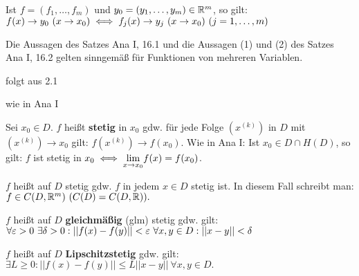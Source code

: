 \documentclass[a4paper,twoside,DIV15,BCOR12mm]{scrbook}
\begin{document}
\begin{satz}
\begin{liste}
\item Ist $f = (f_1,\ldots,f_m)$ und $y_0 = (y_1,\ldots,y_m) \in \mathbb{R}^m$, so gilt: $f(x) \to y_0\ (x \to x_0) \iff f_j(x) \to y_j\ (x \to x_0)\ (j=1,\ldots,m)$
\item Die Aussagen des Satzes Ana I, 16.1 und die Aussagen (1) und (2) des Satzes Ana I, 16.2 gelten sinngemäß für Funktionen von mehreren Variablen.
\end{liste}
\end{satz}

\begin{beweise}
\item folgt aus 2.1
\item wie in Ana I
\end{beweise}

\begin{definition*}
\begin{liste}
\item {}Sei $x_0 \in D$. $f$ heißt \textbf{stetig} in $x_0$ gdw. für jede Folge $(x^{(k)})$ in $D$ mit $(x^{(k)}) \to x_0$ gilt: $f(x^{(k)}) \to f(x_0)$. Wie in Ana I: Ist $x_0 \in D \cap H(D)$, so gilt: $f$ ist stetig in $x_0 \iff \displaystyle{\lim_{x \to x_0}} f(x) = f(x_0)$.
\item {}$f$ heißt auf $D$ stetig gdw. $f$ in jedem $x \in D$ stetig ist. In diesem Fall schreibt man: $f \in C(D,\mathbb{R}^m)\ (C(D) = C(D,\mathbb{R})).$
\item {}$f$ heißt auf $D$ \textbf{gleichmäßig} (glm) stetig gdw. gilt:\\
$\forall \varepsilon>0\ \exists \delta>0: ||f(x)-f(y)|| < \varepsilon\ \forall x,y \in D: ||x-y|| < \delta$
\item {}$f$ heißt auf $D$  \textbf{Lipschitzstetig} gdw. gilt:\\
$\exists L\ge0: ||f(x)-f(y)|| \le L||x-y||\ \forall x,y \in D.$
\end{liste}
\end{definition*}
\end{document}

